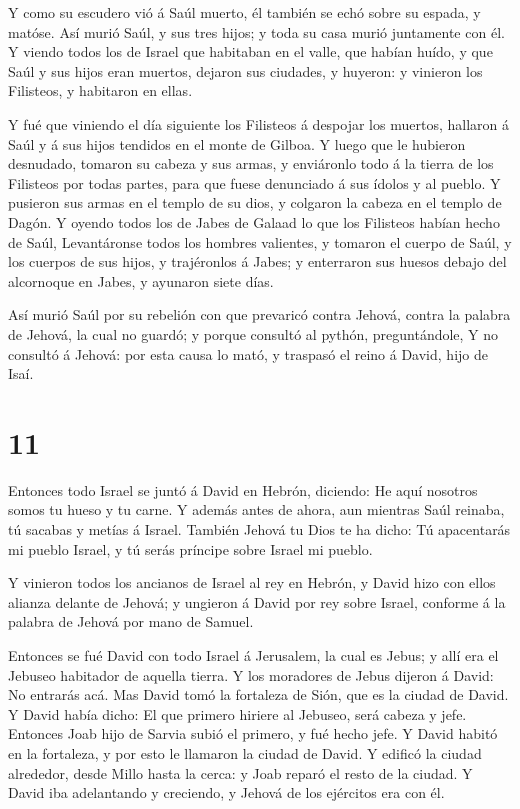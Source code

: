  Y como su escudero vió á Saúl muerto, él también se echó
sobre su espada, y matóse.  Así murió Saúl, y sus tres
hijos; y toda su casa murió juntamente con él.  Y viendo
todos los de Israel que habitaban en el valle, que habían huído, y que
Saúl y sus hijos eran muertos, dejaron sus ciudades, y huyeron: y
vinieron los Filisteos, y habitaron en ellas.

 Y fué que viniendo el día siguiente los Filisteos á
despojar los muertos, hallaron á Saúl y á sus hijos tendidos en el monte
de Gilboa.  Y luego que le hubieron desnudado, tomaron su
cabeza y sus armas, y enviáronlo todo á la tierra de los Filisteos por
todas partes, para que fuese denunciado á sus ídolos y al pueblo.
 Y pusieron sus armas en el templo de su dios, y colgaron
la cabeza en el templo de Dagón.  Y oyendo todos los de
Jabes de Galaad lo que los Filisteos habían hecho de Saúl, 
Levantáronse todos los hombres valientes, y tomaron el cuerpo de Saúl, y
los cuerpos de sus hijos, y trajéronlos á Jabes; y enterraron sus huesos
debajo del alcornoque en Jabes, y ayunaron siete días.

 Así murió Saúl por su rebelión con que prevaricó contra
Jehová, contra la palabra de Jehová, la cual no guardó; y porque
consultó al pythón, preguntándole,  Y no consultó á Jehová:
por esta causa lo mató, y traspasó el reino á David, hijo de Isaí.

\hypertarget{section-10}{%
\section{11}\label{section-10}}

 Entonces todo Israel se juntó á David en Hebrón, diciendo:
He aquí nosotros somos tu hueso y tu carne.  Y además antes
de ahora, aun mientras Saúl reinaba, tú sacabas y metías á Israel.
También Jehová tu Dios te ha dicho: Tú apacentarás mi pueblo Israel, y
tú serás príncipe sobre Israel mi pueblo.

 Y vinieron todos los ancianos de Israel al rey en Hebrón, y
David hizo con ellos alianza delante de Jehová; y ungieron á David por
rey sobre Israel, conforme á la palabra de Jehová por mano de Samuel.

 Entonces se fué David con todo Israel á Jerusalem, la cual
es Jebus; y allí era el Jebuseo habitador de aquella tierra.
 Y los moradores de Jebus dijeron á David: No entrarás acá.
Mas David tomó la fortaleza de Sión, que es la ciudad de David.
 Y David había dicho: El que primero hiriere al Jebuseo,
será cabeza y jefe. Entonces Joab hijo de Sarvia subió el primero, y fué
hecho jefe.  Y David habitó en la fortaleza, y por esto le
llamaron la ciudad de David.  Y edificó la ciudad alrededor,
desde Millo hasta la cerca: y Joab reparó el resto de la ciudad.
 Y David iba adelantando y creciendo, y Jehová de los
ejércitos era con él.

